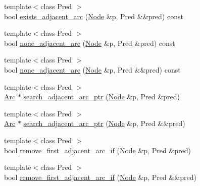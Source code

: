 \begin{DoxyCompactItemize}
\item 
{\footnotesize template$<$class Pred $>$ }\\bool \hyperlink{class_designar_1_1_base_graph_a16d3fbb089265c1dc8da8ffbe2fb1434}{exists\+\_\+adjacent\+\_\+arc} (\hyperlink{namespace_designar_a5af326c65aa2bd26b26c410f2030d09e}{Node} \&p, Pred \&\&pred) const
\item 
{\footnotesize template$<$class Pred $>$ }\\bool \hyperlink{class_designar_1_1_base_graph_acf4b230e0d981f36770722011c96206f}{none\+\_\+adjacent\+\_\+arc} (\hyperlink{namespace_designar_a5af326c65aa2bd26b26c410f2030d09e}{Node} \&p, Pred \&pred) const
\item 
{\footnotesize template$<$class Pred $>$ }\\bool \hyperlink{class_designar_1_1_base_graph_adbacdf829cb2f21aff498bac9c9a8b8b}{none\+\_\+adjacent\+\_\+arc} (\hyperlink{namespace_designar_a5af326c65aa2bd26b26c410f2030d09e}{Node} \&p, Pred \&\&pred) const
\item 
{\footnotesize template$<$class Pred $>$ }\\\hyperlink{namespace_designar_a3f55fb5513d62ff47cbc8f72b8e95d6f}{Arc} $\ast$ \hyperlink{class_designar_1_1_base_graph_a4c9703fdb22d4e1d3cf0428fd705b3ee}{search\+\_\+adjacent\+\_\+arc\+\_\+ptr} (\hyperlink{namespace_designar_a5af326c65aa2bd26b26c410f2030d09e}{Node} \&p, Pred \&pred)
\item 
{\footnotesize template$<$class Pred $>$ }\\\hyperlink{namespace_designar_a3f55fb5513d62ff47cbc8f72b8e95d6f}{Arc} $\ast$ \hyperlink{class_designar_1_1_base_graph_aac7ed362d5f21fcc6e583d4b9e03babb}{search\+\_\+adjacent\+\_\+arc\+\_\+ptr} (\hyperlink{namespace_designar_a5af326c65aa2bd26b26c410f2030d09e}{Node} \&p, Pred \&\&pred)
\item 
{\footnotesize template$<$class Pred $>$ }\\bool \hyperlink{class_designar_1_1_base_graph_ab7c2c2129abb3200b854e23f34e513e8}{remove\+\_\+first\+\_\+adjacent\+\_\+arc\+\_\+if} (\hyperlink{namespace_designar_a5af326c65aa2bd26b26c410f2030d09e}{Node} \&p, Pred \&pred)
\item 
{\footnotesize template$<$class Pred $>$ }\\bool \hyperlink{class_designar_1_1_base_graph_abe36f7676c51362b9a0f560d3c062772}{remove\+\_\+first\+\_\+adjacent\+\_\+arc\+\_\+if} (\hyperlink{namespace_designar_a5af326c65aa2bd26b26c410f2030d09e}{Node} \&p, Pred \&\&pred)
\item 

\end{DoxyCompactItemize}
